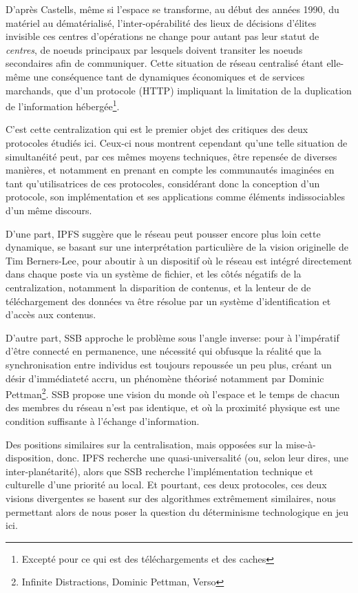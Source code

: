 \documentclass{article}
\begin{document}
D'après Castells, même si l'espace se transforme, au début des années 1990, du matériel au dématérialisé, l'inter-opérabilité des lieux de décisions d'élites invisible ces centres d'opérations ne change pour autant pas leur statut de \emph{centres}, de noeuds principaux par lesquels doivent transiter les noeuds secondaires afin de communiquer. Cette situation de réseau centralisé étant elle-même une conséquence tant de dynamiques économiques et de services marchands, que d'un protocole (HTTP) impliquant la limitation de la duplication de l'information hébergée\footnote{Excepté pour ce qui est des téléchargements et des caches}.

C'est cette centralization qui est le premier objet des critiques des deux protocoles étudiés ici. Ceux-ci nous montrent cependant qu'une telle situation de simultanéité peut, par ces mêmes moyens techniques, être repensée de diverses manières, et notamment en prenant en compte les communautés imaginées en tant qu'utilisatrices de ces protocoles, considérant donc la conception d'un protocole, son implémentation et ses applications comme éléments indissociables d'un même discours.

D'une part, IPFS suggère que le réseau peut pousser encore plus loin cette dynamique, se basant sur une interprétation particulière de la vision originelle de Tim Berners-Lee, pour aboutir à un dispositif où le réseau est intégré directement dans chaque poste via un système de fichier, et les côtés négatifs de la centralization, notamment la disparition de contenus, et la lenteur de de téléchargement des données va être résolue par un système d'identification et d'accès aux contenus.

D'autre part, SSB approche le problème sous l'angle inverse: pour à l'impératif d'être connecté en permanence, une nécessité qui obfusque la réalité que la synchronisation entre individus est toujours repoussée un peu plus, créant un désir d'immédiateté accru, un phénomène théorisé notamment par Dominic Pettman\footnote{Infinite Distractions, Dominic Pettman, Verso}. SSB propose une vision du monde où l'espace et le temps de chacun des membres du réseau n'est pas identique, et où la proximité physique est une condition suffisante à l'échange d'information.

Des positions similaires sur la centralisation, mais opposées sur la mise-à-disposition, donc. IPFS recherche une quasi-universalité (ou, selon leur dires, une inter-planétarité), alors que SSB recherche l'implémentation technique et culturelle d'une priorité au local. Et pourtant, ces deux protocoles, ces deux visions divergentes se basent sur des algorithmes extrêmement similaires, nous permettant alors de nous poser la question du déterminisme technologique en jeu ici.
\end{document}
